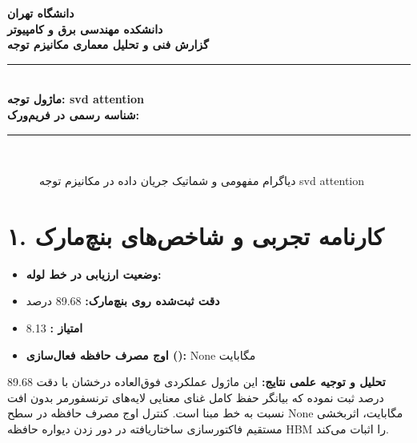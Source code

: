 \documentclass[12pt,a4paper]{article}
\begin{document}
\begin{center}
{\Large\bfseries دانشگاه تهران}\\[0.2cm]
{\large\bfseries دانشکده مهندسی برق و کامپیوتر}\\[0.2cm]
{\large\bfseries گزارش فنی و تحلیل معماری مکانیزم توجه}\\[0.5cm]
\rule{\linewidth}{1pt}\\[0.3cm]
{\LARGE\bfseries ماژول توجه: svd attention}\\[0.2cm]
{\large \textbf{شناسه رسمی در فریم‌ورک:} }\\[0.2cm]
\rule{\linewidth}{1pt}\\[0.5cm]
\end{center}

\begin{figure}[H]
\centering
{}
\caption{دیاگرام مفهومی و شماتیک جریان داده در مکانیزم توجه svd attention}
\end{figure}

\section*{۱. کارنامه تجربی و شاخص‌های بنچ‌مارک}
\begin{itemize}
\item \textbf{وضعیت ارزیابی در خط لوله:} 
\item \textbf{دقت ثبت‌شده روی بنچ‌مارک:} 89.68 درصد
\item \textbf{امتیاز :} 8.13
\item \textbf{اوج مصرف حافظه فعال‌سازی ():} None مگابایت
\end{itemize}
\textbf{تحلیل و توجیه علمی نتایج:} این ماژول عملکردی فوق‌العاده درخشان با دقت 89.68 درصد ثبت نموده که بیانگر حفظ کامل غنای معنایی لایه‌های ترنسفورمر بدون افت نسبت به خط مبنا است. کنترل اوج مصرف حافظه در سطح None مگابایت، اثربخشی مستقیم فاکتورسازی ساختاریافته در دور زدن دیواره حافظه HBM را اثبات می‌کند.
\end{document}
